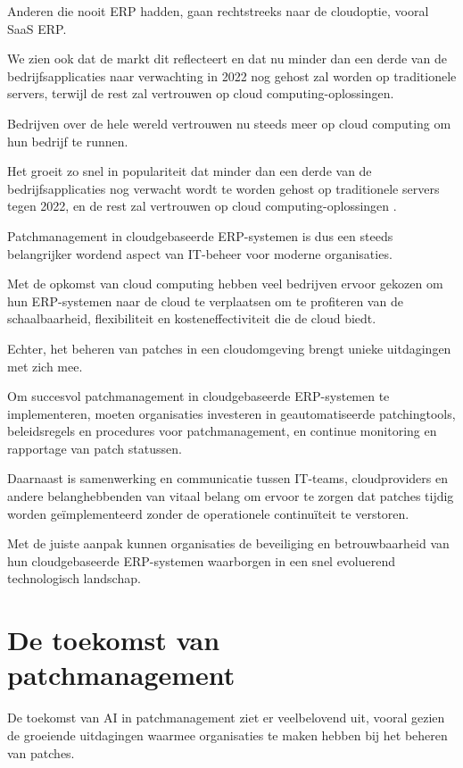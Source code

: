  Anderen die nooit ERP hadden, gaan rechtstreeks naar de cloudoptie, vooral SaaS ERP.


We zien ook dat de markt dit reflecteert en dat nu minder dan een derde van de bedrijfsapplicaties naar verwachting in 2022 nog gehost zal worden op traditionele servers, terwijl de rest zal vertrouwen op cloud computing-oplossingen.

 Bedrijven over de hele wereld vertrouwen nu steeds meer op cloud computing om hun bedrijf te runnen.

 Het groeit zo snel in populariteit dat minder dan een derde van de bedrijfsapplicaties nog verwacht wordt te worden gehost op traditionele servers tegen 2022, en de rest zal vertrouwen op cloud computing-oplossingen \autocite{Pimentel2017}.


Patchmanagement in cloudgebaseerde ERP-systemen is dus een steeds belangrijker wordend aspect van IT-beheer voor moderne organisaties.

 Met de opkomst van cloud computing hebben veel bedrijven ervoor gekozen om hun ERP-systemen naar de cloud te verplaatsen om te profiteren van de schaalbaarheid, flexibiliteit en kosteneffectiviteit die de cloud biedt.

 Echter, het beheren van patches in een cloudomgeving brengt unieke uitdagingen met zich mee.


Om succesvol patchmanagement in cloudgebaseerde ERP-systemen te implementeren, moeten organisaties investeren in geautomatiseerde patchingtools, beleidsregels en procedures voor patchmanagement, en continue monitoring en rapportage van patch statussen.

 Daarnaast is samenwerking en communicatie tussen IT-teams, cloudproviders en andere belanghebbenden van vitaal belang om ervoor te zorgen dat patches tijdig worden geïmplementeerd zonder de operationele continuïteit te verstoren.

 Met de juiste aanpak kunnen organisaties de beveiliging en betrouwbaarheid van hun cloudgebaseerde ERP-systemen waarborgen in een snel evoluerend technologisch landschap.



\section{De toekomst van patchmanagement}
De toekomst van AI in patchmanagement ziet er veelbelovend uit, vooral gezien de groeiende uitdagingen waarmee organisaties te maken hebben bij het beheren van patches.

